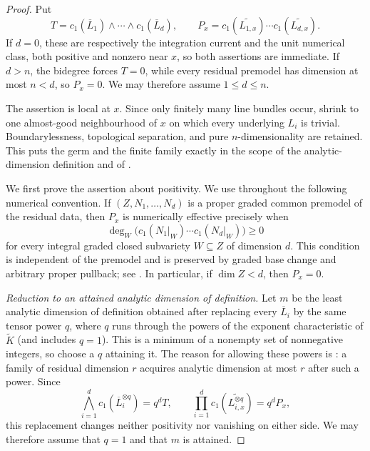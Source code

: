 \begin{proof}
Put
\[
 T=c_1(\overline L_1)\wedge\cdots\wedge c_1(\overline L_d),
 \qquad
 P_x=c_1(\widetilde{L_{1,x}})\cdots
          c_1(\widetilde{L_{d,x}}).
\]
If $d=0$, these are respectively the integration current and the unit
numerical class, both positive and nonzero near $x$, so both assertions
are immediate.  If $d>n$, the bidegree forces $T=0$, while every
residual premodel has dimension at most $n<d$, so $P_x=0$.  We may
therefore assume $1\leq d\leq n$.

The assertion is local at $x$.  Since only finitely many line bundles
occur, shrink to one almost-good neighbourhood of $x$ on which every
underlying $L_i$ is trivial.  Boundarylessness, topological separation,
and pure $n$-dimensionality are retained.  This puts the germ and the
finite family exactly in the scope of the analytic-dimension definition
and of \cite[Proposition~17.6.4]{CLD25}.

We first prove the assertion about positivity.  We use throughout the
following numerical convention.  If $(Z,N_1,\ldots,N_d)$ is a proper
graded common premodel of the residual data, then $P_x$ is numerically
effective precisely when
\begin{equation}
 \deg_W\bigl(c_1(N_1|_W)\cdots c_1(N_d|_W)\bigr)\geq0
 \label{eq:ch17-formal-positivity-numerical-test}
\end{equation}
for every integral graded closed subvariety $W\subseteq Z$ of dimension
$d$.  This condition is independent of the premodel and is preserved by
graded base change and arbitrary proper pullback; see
\cite[\S\S10.4.11 and 10.7.14]{CLD25}.  In particular, if
$\dim Z<d$, then $P_x=0$.

\emph{Reduction to an attained analytic dimension of definition.}
Let $m$ be the least analytic dimension of definition obtained after
replacing every $\overline L_i$ by the same tensor power $q$, where
$q$ runs through the powers of the exponent characteristic of
$\widetilde K$ (and includes $q=1$).  This is a minimum of a nonempty
set of nonnegative integers, so choose a $q$ attaining it.  The reason for
allowing these powers is \cite[Proposition~17.6.4]{CLD25}: a family of
residual dimension $r$ acquires analytic dimension at most $r$ after
such a power.  Since
\[
 \bigwedge_{i=1}^d c_1(\overline L_i^{\otimes q})=q^dT,
 \qquad
 \prod_{i=1}^dc_1(\widetilde{L_{i,x}^{\otimes q}})=q^dP_x,
\]
this replacement changes neither positivity nor vanishing on either side.
We may therefore assume that $q=1$ and that $m$ is attained.


\end{proof}

